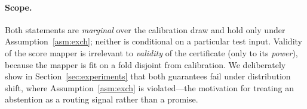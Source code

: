 \paragraph{Scope.} Both statements are \emph{marginal} over the calibration draw and hold only under
Assumption~\ref{asm:exch}; neither is conditional on a particular test input. Validity of the score
mapper is irrelevant to \emph{validity} of the certificate (only to its \emph{power}), because the
mapper is fit on a fold disjoint from calibration. We deliberately show in
Section~\ref{sec:experiments} that both guarantees fail under distribution shift, where
Assumption~\ref{asm:exch} is violated---the motivation for treating an abstention as a routing signal
rather than a promise.

